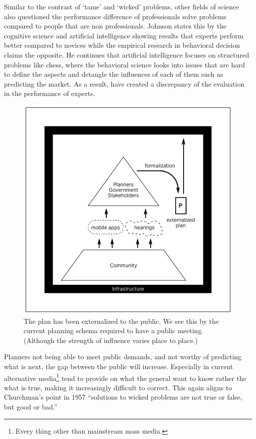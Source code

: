 Similar to the contrast of `tame' and `wicked' problems, other fields of
science also questioned the performance difference of professionals solve
problems compared to people that are non professionals. 
Johnson states this by the cognitive science and artificial
intelligence showing results that experts perform better compared to
novices while the empirical research in behavioral decision claims the
opposite. \cite{chi2014nature}
He continues that artificial intelligence focuses on structured
problems like chess, where the behavioral science looks into issues that
are hard to define the aspects and detangle the influences of each of them
such as predicting the market. As a result, have created a discrepancy of
the evaluation in the performance of experts.

\begin{figure}[htb]
  \includegraphics[width=\textwidth]{chapters/2/fig/externalized_plan.png}               
  \caption[diagram: externalized plan]{The plan has been externalized to the public. We see this by the current planning schema required to have a public meeting. (Although the strength of influence varies place to place.)}
  \label{fig:externalized_plan}
\end{figure}

Planners not being able to meet public demands, and not worthy of
predicting what is next, the gap between the public will increase.
Especially in current alternative media\footnote{Every thing other than
mainstream mass media.} tend to provide on what the general want to know
rather the what is true, making it increasingly difficult to correct.
This again aligns to Churchman's point in 1957 ``solutions to wicked problems are
not true or false, but good or bad.''

